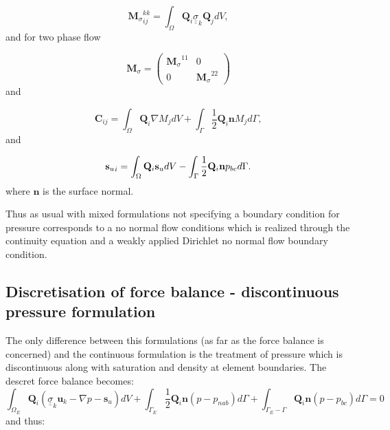 \begin{equation}
{{\mathbf M}_\sigma}^{kk}_{ij} =  \int_\Omega {\mathbf Q}_i 
{\underline {\underline \sigma}}_k {\mathbf Q}_j dV, 
\end{equation}
and for two phase flow

\begin{equation}
{{\mathbf M}_\sigma} = 
  \begin{pmatrix}
    {{\mathbf M}_\sigma}^{11}   & 0 \\
    0   & {{\mathbf M}_\sigma}^{22} 
  \end{pmatrix}
\label{m_sigma_matrix}
\end{equation}
and 

\begin{equation}
{\mathbf C}_{ij}=\int_\Omega {\mathbf Q}_i \nabla M_j dV 
+ \int_\Gamma \frac{1}{2}{\mathbf Q}_i {\mathbf n}  M_j d\Gamma,
\end{equation} 
and 

\begin{equation}
{{\bf s}_u}_i= \int_\Omega {\mathbf Q}_i {\mathbf s}_u dV 
- \int_\Gamma \frac{1}{2}{\mathbf Q}_i {\mathbf n} p_{bc} d\Gamma. 
\end{equation}
where ${\mathbf n}$ is the surface normal. 

Thus as usual with mixed formulations not specifying a 
boundary condition for pressure corresponds to a no 
normal flow conditions which is realized through the continuity 
equation and a weakly applied Dirichlet no normal 
flow boundary condition. 



\subsection{Discretisation of force balance - discontinuous pressure formulation} 

The only difference between this formulations (as far as the force balance 
is concerned) and the continuous formulation is the treatment of pressure 
which is discontinuous along with saturation and density at element 
boundaries. The descret force balance becomes:
\begin{equation}
\int_{\Omega_E} {\mathbf Q}_i ( {\underline {\underline \sigma}}_k 
{\mathbf u}_k - \nabla p -{\mathbf s}_u) dV 
+  \int_{\Gamma_{E}} \frac{1}{2}{\mathbf Q}_i {\mathbf n} (p - p_{nab}) d\Gamma 
+  \int_{\Gamma_{E}-\Gamma} {\mathbf Q}_i {\mathbf n} (p - p_{bc}) d\Gamma =0
\end{equation}
and thus: 

